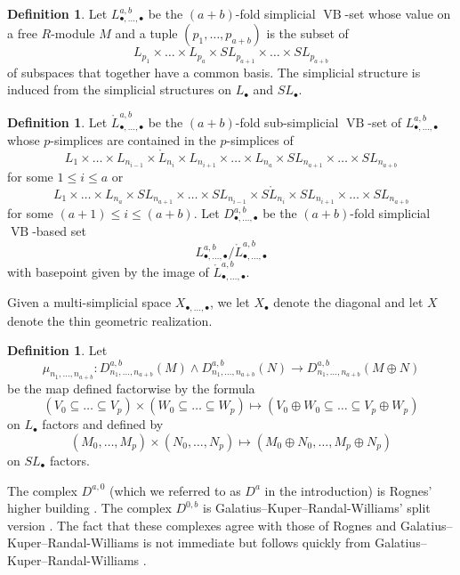 \documentclass[a4paper]{amsart}
\DeclareMathOperator{\VB}{VB}
\numberwithin{theoremcounter}{section}
\theoremstyle{definition}
\newtheorem{definition}[Defauto]{Definition}
\theoremstyle{remark}
\begin{document}
\begin{definition}
Let $L^{a,b}_{\bullet,\dots,\bullet}$ be the $(a+b)$-fold simplicial $\VB$-set  whose value on a free $R$-module $M$ and a tuple $(p_1,\dots,p_{a+b})$ is the subset of $$L_{p_1} \times \dots \times L_{p_a} \times SL_{p_{a+1}} \times \dots \times SL_{p_{a+b}}$$ of subspaces that together have a common basis. The simplicial structure is induced from the simplicial structures on $L_\bullet$ and $SL_{\bullet}$. 
\end{definition}

\begin{definition}
Let $\mathring{L}^{a,b}_{\bullet,\dots,\bullet}$ be the $(a+b)$-fold sub-simplicial $\VB$-set of $L^{a,b}_{\bullet,\dots,\bullet}$ whose $p$-simplices are contained in the $p$-simplices of 
$$L_1 \times \dots \times L_{n_{i-1}} \times \mathring{L}_{n_i} \times  L_{n_{i+1}} \times  \dots   \times L_{n_a} \times SL_{n_{a+1}} \times \dots \times SL_{n_{a+b}}$$ for some $1 \leq i \leq a$ or  $$L_1 \times \dots \times   L_{n_a} \times SL_{n_{a+1}} \times \dots  \times SL_{n_{i-1}} \times S\mathring{L}_{n_i} \times  SL_{n_{i+1}} \times \dots \times SL_{n_{a+b}}$$ for some $(a+1) \leq i \leq (a+b)$. Let $D^{a,b}_{\bullet,\dots,\bullet}$ be the $(a+b)$-fold simplicial $\VB$-based set $$L^{a,b}_{\bullet,\dots,\bullet} / \mathring{L}^{a,b}_{\bullet,\dots,\bullet}$$ with basepoint given by the image of $\mathring{L}^{a,b}_{\bullet,\dots,\bullet}$.



\end{definition}

Given a multi-simplicial space $X_{\bullet,\dots,\bullet}$, we let $X_\bullet$ denote the diagonal and let $X$ denote the thin geometric realization. 

\begin{definition}  \label{Dab}
Let $$\mu_{n_1,\dots,n_{a+b}}\colon  D^{a,b}_{n_1,\dots,n_{a+b}}(M) \wedge D^{a,b}_{n_1,\dots,n_{a+b}}(N) \longrightarrow D^{a,b}_{n_1,\dots,n_{a+b}}(M \oplus N)$$ be the map defined factorwise  by the formula 
$$(V_0 \subseteq \dots \subseteq V_p) \times (W_0 \subseteq \dots \subseteq W_p) \longmapsto (V_0 \oplus W_0 \subseteq \dots \subseteq V_p \oplus W_p)$$ on $L_\bullet$ factors and defined by $$(M_0, \dots, M_p) \times (N_0, \dots, N_p) \longmapsto (M_0 \oplus N_0, \dots, M_p \oplus N_p)$$ on $SL_\bullet$ factors.
\end{definition}

The complex $D^{a,0}$ (which we referred to as $D^a$ in the introduction) is Rognes' higher building \cite{Rog1}. The complex $D^{0,b}$ is Galatius--Kuper--Randal-Williams' split version \cite{e2cellsIV}. The fact that these complexes agree with those of Rognes and Galatius--Kuper--Randal-Williams is not immediate but follows quickly from Galatius--Kuper--Randal-Williams \cite[Lemma 5.6 and Lemma 5.7]{e2cellsIV}.
\end{document}
